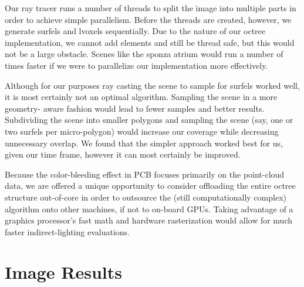 \documentclass[12pt]{ucthesis}
\begin{document}
\vspace{5mm}

Our ray tracer runs a number of threads to split the image into multiple parts  in order to achieve simple parallelism.  Before the threads are created, however, we generate surfels and lvoxels sequentially.  Due to the nature of our octree implementation, we cannot add elements and still be thread safe, but this would not be a large obstacle.  Scenes like the sponza atrium would run a number of times faster if we were to parallelize our implementation more effectively.

\vspace{5mm}

Although for our purposes ray casting the scene to sample for surfels worked well, it is most certainly not an optimal algorithm.  Sampling the scene in a more geometry- aware fashion would lead to fewer samples and better results.  Subdividing the scene into smaller polygons and sampling the scene (say, one or two surfels per micro-polygon) would increase our coverage while decreasing unnecessary overlap.  We found that the simpler approach worked best for us, given our time frame, however it can most certainly be improved.

\vspace{5mm}

Because the color-bleeding effect in PCB focuses primarily on the point-cloud data, we are offered a unique opportunity to consider offloading the entire octree structure out-of-core in order to outsource the (still computationally complex) algorithm onto other machines, if not to on-board GPUs.  Taking advantage of a graphics processor's fast math and hardware rasterization would allow for much faster indirect-lighting evaluations.


\clearpage






\section*{Image Results}
\end{document}

